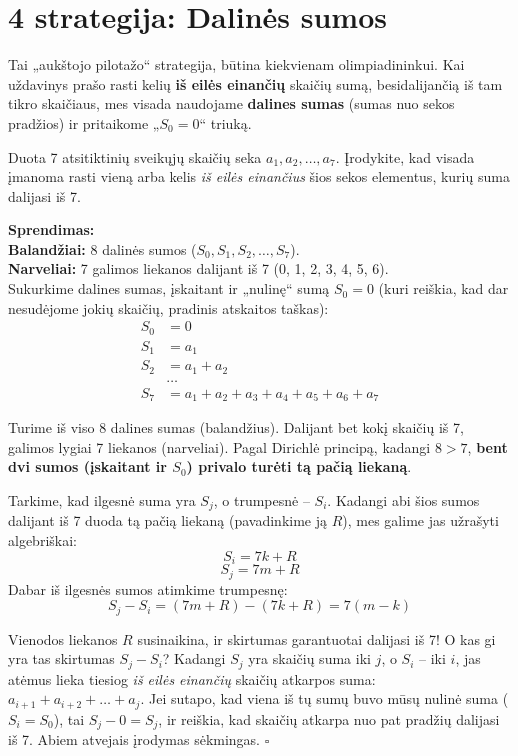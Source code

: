 \documentclass[11pt,a4paper]{scrartcl}
\newenvironment{solution}
    {\begin{list}{}{\setlength{\leftmargin}{10pt}\setlength{\rightmargin}{10pt}}\item[]}
    {\end{list}}
\begin{document}
\section{4 strategija: Dalinės sumos}

Tai „aukštojo pilotažo“ strategija, būtina kiekvienam olimpiadininkui. Kai uždavinys prašo rasti kelių \textbf{iš eilės einančių} skaičių sumą, besidalijančią iš tam tikro skaičiaus, mes visada naudojame \textbf{dalines sumas} (sumas nuo sekos pradžios) ir pritaikome „$S_0=0$“ triuką.

\begin{example}
Duota 7 atsitiktinių sveikųjų skaičių seka $a_1, a_2, \dots, a_7$. Įrodykite, kad visada įmanoma rasti vieną arba kelis \textit{iš eilės einančius} šios sekos elementus, kurių suma dalijasi iš 7.
\end{example}

\begin{solution}
\textbf{Sprendimas:} \\
\textbf{Balandžiai:} 8 dalinės sumos ($S_0, S_1, S_2, \dots, S_7$).\\
\textbf{Narveliai:} 7 galimos liekanos dalijant iš 7 (0, 1, 2, 3, 4, 5, 6).\\

Sukurkime dalines sumas, įskaitant ir „nulinę“ sumą $S_0 = 0$ (kuri reiškia, kad dar nesudėjome jokių skaičių, pradinis atskaitos taškas):
\begin{align*}
S_0 &= 0 \\
S_1 &= a_1 \\
S_2 &= a_1 + a_2 \\
&\dots \\
S_7 &= a_1 + a_2 + a_3 + a_4 + a_5 + a_6 + a_7
\end{align*}

Turime iš viso 8 dalines sumas (balandžius). Dalijant bet kokį skaičių iš 7, galimos lygiai 7 liekanos (narveliai). Pagal Dirichlė principą, kadangi $8 > 7$, \textbf{bent dvi sumos (įskaitant ir $S_0$) privalo turėti tą pačią liekaną}. 

Tarkime, kad ilgesnė suma yra $S_j$, o trumpesnė – $S_i$. Kadangi abi šios sumos dalijant iš 7 duoda tą pačią liekaną (pavadinkime ją $R$), mes galime jas užrašyti algebriškai:
\[ S_i = 7k + R \]
\[ S_j = 7m + R \]
Dabar iš ilgesnės sumos atimkime trumpesnę:
\[ S_j - S_i = (7m + R) - (7k + R) = 7(m - k) \]

Vienodos liekanos $R$ susinaikina, ir skirtumas garantuotai dalijasi iš 7! 
O kas gi yra tas skirtumas $S_j - S_i$? Kadangi $S_j$ yra skaičių suma iki $j$, o $S_i$ – iki $i$, jas atėmus lieka tiesiog \textit{iš eilės einančių} skaičių atkarpos suma: $a_{i+1} + a_{i+2} + \dots + a_j$. 
Jei sutapo, kad viena iš tų sumų buvo mūsų nulinė suma ($S_i = S_0$), tai $S_j - 0 = S_j$, ir reiškia, kad skaičių atkarpa nuo pat pradžių dalijasi iš 7. Abiem atvejais įrodymas sėkmingas. \hfill $\square$
\end{solution}
\end{document}
